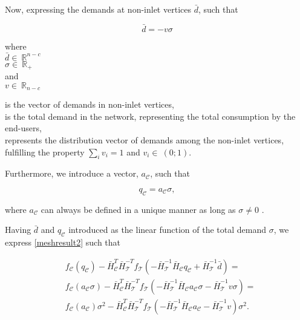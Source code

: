 Now, expressing the demands at non-inlet vertices $\bar{d}$, such that

\begin{equation}
\label{noninlet_demand}
\bar{d} = - v \sigma
\end{equation}

  \begin{minipage}[t]{0.20\textwidth}
where\\
\hspace*{8mm} $\bar{d} \in \: \mathbb{R}^{n-c}$\\
\hspace*{8mm} $\sigma \in \: \mathbb{R}_{+}$ \\
\newline
and\\
\hspace*{8mm} $v \in \: \mathbb{R}_{n-c}$
\end{minipage}
\begin{minipage}[t]{0.68\textwidth}
\vspace*{2mm}
is the vector of demands in non-inlet vertices,\\
is the total demand in the network, representing the total consumption by the end-users,\\
\newline
represents the distribution vector of demands among the non-inlet vertices, fulfilling the property $\sum_{i} v_i = 1 $ and $v_i \in \: (0;1)$.
\end{minipage}

Furthermore, we introduce a vector, $a_{\mathcal{C}}$, such that 

\begin{equation}
\label{ac}
q_{\mathcal{C}} = a_{\mathcal{C}} \sigma,
\end{equation}

where $a_{\mathcal{C}}$ can always be defined in a unique manner as long as $\sigma \neq 0$ \cite{oneinput_paper}.

Having $\bar{d}$ and $q_{\mathcal{C}}$ introduced as the linear function of the total demand $\sigma$, we express \eqref{meshresult2} such that

\begin{equation}
\begin{split}
\label{meshresult3}
& f_{\mathcal{C}}(q_\mathcal{C}) -\bar{H}^T_{\mathcal{C}}\bar{H}^{-T}_{\mathcal{T}} f_{\mathcal{T}}(-\bar{H}^{-1}_{\mathcal{T}} \bar{H}_{\mathcal{C}} q_\mathcal{C} + \bar{H}^{-1}_{\mathcal{T}} \bar{d}) = \\
& f_{\mathcal{C}}(a_{\mathcal{C}} \sigma) -\bar{H}^T_{\mathcal{C}}\bar{H}^{-T}_{\mathcal{T}} f_{\mathcal{T}}(-\bar{H}^{-1}_{\mathcal{T}} \bar{H}_{\mathcal{C}} a_{\mathcal{C}} \sigma - \bar{H}^{-1}_{\mathcal{T}} v \sigma) = \\
& f_{\mathcal{C}}(a_{\mathcal{C}})\sigma^2 -\bar{H}^T_{\mathcal{C}}\bar{H}^{-T}_{\mathcal{T}} f_{\mathcal{T}}(-\bar{H}^{-1}_{\mathcal{T}} \bar{H}_{\mathcal{C}} a_{\mathcal{C}} - \bar{H}^{-1}_{\mathcal{T}} v) \sigma^2.
\end{split}
\end{equation} 

